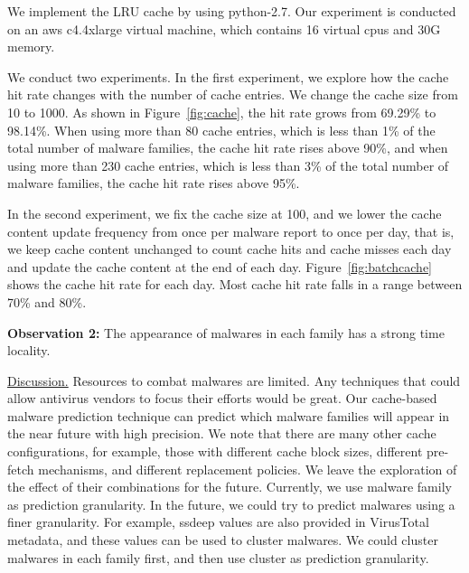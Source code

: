 We implement the LRU cache by using
python-2.7. Our experiment is conducted on an aws c4.4xlarge virtual machine, 
which contains 16 virtual cpus and 30G memory.

We conduct two experiments. In the first experiment, 
we explore how the cache hit rate changes with the number of cache entries. 
We change the cache size from 10 to 1000. As shown in Figure~\ref{fig:cache}, 
the hit rate grows from 69.29\% to 98.14\%. 
When using more than 80 cache entries, which is less than 1\% of the total number of malware families, the cache hit rate rises above 90\%, 
and when using more than 230 cache entries, which is less than 3\% of the total number of malware families, 
the cache hit rate rises above 95\%. 

In the second experiment, we fix the cache size at 100, 
and we lower the cache content update frequency from once per malware report to once per day, 
that is, we keep cache content unchanged to count cache hits and cache misses each day and update the cache content at the end of each day.
Figure~\ref{fig:batchcache} shows the cache hit rate for each day. 
Most cache hit rate falls in a range between 70\% and 80\%.  


{\bf Observation 2:} 
The appearance of malwares in each family has a strong time locality.  

\underline{Discussion.}
Resources to combat malwares are limited. 
Any techniques that could allow antivirus vendors to focus their efforts would be great. 
Our cache-based malware prediction technique can predict which malware families will appear in the near future with high precision. 
We note that there are many other cache configurations, for example, those
with different cache block sizes, different pre-fetch mechanisms, 
and different replacement policies. 
We leave the exploration of the effect of their combinations for the future. 
Currently, we use malware family as prediction granularity. 
In the future, we could try to predict malwares using a finer granularity. 
For example, ssdeep values are also provided in VirusTotal metadata, 
and these values can be used to cluster malwares. 
We could cluster malwares in each family first, and then use cluster as prediction granularity. 
